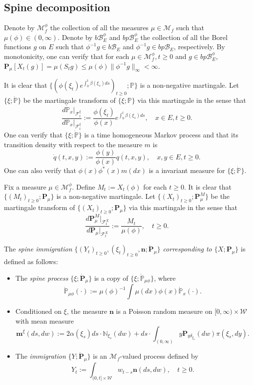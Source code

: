 \subsection{Spine decomposition}
	Denote by $\mathcal M_f^\phi$ the collection of all the measures $\mu \in \mathcal M_f$ such that $\mu(\phi) \in (0,\infty)$.
	Denote by $b\mathscr B_E^\phi$ and $bp\mathscr B_E^\phi$ the collection of all the Borel functions $g$ on $E$ such that $\phi^{-1} g\in b\mathscr B_E$ and $\phi^{-1} g\in bp\mathscr B_E$, respectively.
	By monotonicity, one can verify that for each $\mu \in \mathcal M^\phi_f, t \geq 0$ and $g \in bp\mathscr B_E^\phi$, $\mathbf P_\mu[X_t(g)] = \mu(S_t g) \leq \mu(\phi) \|\phi^{-1} g\|_\infty < \infty$.
\par
	It is clear that $\{(\phi(\xi_t) e^{\int_0^t \beta(\xi_s) ds})_{t \geq 0}; \mathbb P\}$ is a non-negative martingale.
	Let $\{\xi; \dot{\mathbb P}\}$ be the martingale transform of $\{\xi; \mathbb P\}$ via this martingale in the sense that
\[
	\frac {d \dot{\mathbb P}_x|_{\mathscr F_t^\xi}} {d \mathbb P_x|_{\mathscr F_t^\xi}}
	:= \frac {\phi(\xi_t)} {\phi(x)} e^{\int_0^t \beta(\xi_s) ds},
	\quad x \in E,t \geq 0.
\]
	One can verify that $\{\xi; \dot{\mathbb P}\}$ is a time homogeneous Markov process and that its transition density with respect to the measure $m$ is
\[
	\dot{q}(t,x,y)
	:= \frac {\phi(y)} {\phi(x)} q(t,x,y),
	\quad x, y\in E, t\geq 0.
\]
	One can also verify that $\phi(x)\phi^*(x)m(dx)$ is a invariant measure for $\{\xi; \dot{\mathbb P}\}$.
\par
	Fix a measure $\mu \in \mathcal M^\phi_f$.
	Define $M_t := X_t(\phi)$ for each $t \geq 0$.
	It is clear that $\{(M_t)_{t\geq 0}; \mathbf P_\mu\}$ is a non-negative martingale.
	Let $\{(X_t)_{t\geq 0}; \mathbf P_\mu^M\}$ be the martingale transform of $\{(X_t)_{t\geq 0}; \mathbf P_\mu\}$ via this martingale in the sense that
\[
	\frac {d \mathbf P_\mu^M |_{\mathscr F_t^X}} {d \mathbf P_\mu |_{\mathscr F_t^X}}
	:= \frac {M_t} {\mu(\phi)},
	\quad t \geq 0.
\]
\par
	The \emph{spine immigration $\{(Y_t)_{t\geq 0}, (\xi_t)_{t\geq 0}, \mathbf n; \dot {\mathbf P}_\mu\}$ corresponding to $\{X; \mathbf P_\mu\}$}
	is defined as follows:
\begin{itemize}
\item
	The \emph{spine process} $\{\xi; \dot{\mathbf P}_\mu\}$ is a copy of $\{\xi; \dot{\mathbb P}_{\mu\phi}\}$, where
\[
	\dot {\mathbb P}_{\mu\phi}(\cdot)
	:= \mu(\phi)^{-1} \int \mu(dx) \phi(x) \dot{\mathbb P}_x(\cdot).
\]
\item
    Conditioned on $\xi$, the measure $\mathbf n$ is a Poisson random measure on $[0,\infty) \times \mathcal W$ with mean measure
\[
	\mathbf m^\xi(ds,dw)
	:= 2 \alpha(\xi_s) ds \cdot \mathbb N_{\xi_s}(dw) + ds \cdot \int_{(0,\infty)} y \mathbf P_{y \delta_{\xi_s}}(dw) \pi(\xi_s,dy).
\]
\item
	The \emph{immigration} $\{Y; \dot{\mathbf P}_\mu\}$ is an $\mathcal M_f$-valued process defined by
\[
	Y_t
	:= \int_{(0,t] \times \mathcal W} w_{t-s} \mathbf n(ds,dw),
	\quad t \geq 0.
\]
\end{itemize}
